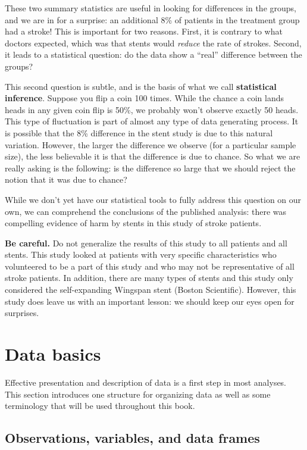 \documentclass[
  10pt,
  openany]{book}
\theoremstyle{definition}
\theoremstyle{definition}
\theoremstyle{definition}
\theoremstyle{definition}
\theoremstyle{remark}
\begin{document}
These two summary statistics are useful in looking for differences in the groups, and we are in for a surprise: an additional 8\% of patients in the treatment group had a stroke!
This is important for two reasons.
First, it is contrary to what doctors expected, which was that stents would \emph{reduce} the rate of strokes.
Second, it leads to a statistical question: do the data show a ``real'' difference between the groups?

This second question is subtle, and is the basis of what we call \textbf{statistical inference}.
Suppose you flip a coin 100 times. While the chance a coin lands heads in any given coin flip is 50\%, we probably won't observe exactly 50 heads.
This type of fluctuation is part of almost any type of data generating process.
It is possible that the 8\% difference in the stent study is due to this natural variation.
However, the larger the difference we observe (for a particular sample size), the less believable it is that the difference is due to chance.
So what we are really asking is the following: is the difference so large that we should reject the notion that it was due to chance?

While we don't yet have our statistical tools to fully address this question on our own, we can comprehend the conclusions of the published analysis: there was compelling evidence of harm by stents in this study of stroke patients.

\textbf{Be careful.}
Do not generalize the results of this study to all patients and all stents.
This study looked at patients with very specific characteristics who volunteered to be a part of this study and who may not be representative of all stroke patients.
In addition, there are many types of stents and this study only considered the self-expanding Wingspan stent (Boston Scientific).
However, this study does leave us with an important lesson: we should keep our eyes open for surprises.


\section{Data basics}\label{data-basics}

Effective presentation and description of data is a first step in most analyses. This section introduces one structure for organizing data as well as some terminology that will be used throughout this book.

\subsection{Observations, variables, and data frames}\label{observations-variables-and-data-frames}
\end{document}
